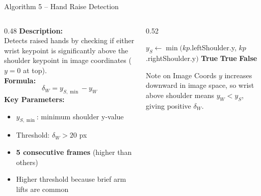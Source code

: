 \documentclass{beamer}
\begin{document}
\begin{frame}{Algorithm 5 -- Hand Raise Detection}
\begin{columns}
\begin{column}{0.48\textwidth}
\footnotesize
\textbf{Description:}\\
Detects raised hands by checking if either wrist keypoint is significantly above the shoulder keypoint in image coordinates ($y=0$ at top).\\[0.3cm]
\textbf{Formula:}
\[
\delta_W = y_{S,\min} - y_W
\]
\textbf{Key Parameters:}
\begin{itemize}\footnotesize
    \item $y_{S,\min}$: minimum shoulder y-value
    \item Threshold: $\delta_W > 20$ px
    \item \textbf{5 consecutive frames} (higher than others)
    \item Higher threshold because brief arm lifts are common
\end{itemize}
\end{column}
\begin{column}{0.52\textwidth}
\begin{algorithmic}[1]
\footnotesize
{}
  \State $y_{S} \gets \min(kp$.leftShoulder.y, $kp$.rightShoulder.y$)$
    \State \Return \textbf{True}
  \EndIf
    \State \Return \textbf{True}
  \EndIf
  \State \Return \textbf{False}
\EndFunction
\end{algorithmic}
\vspace{0.4cm}
\begin{alertblock}{\footnotesize Note on Image Coords}
\footnotesize $y$ increases downward in image space, so wrist above shoulder means $y_W < y_S$, giving positive $\delta_W$.
\end{alertblock}
\end{column}
\end{columns}
\end{frame}
\end{document}
